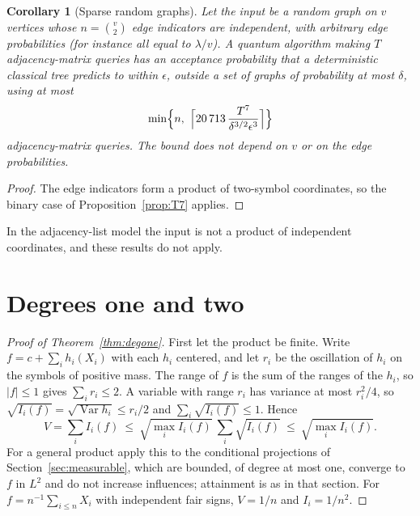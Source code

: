 \documentclass[11pt]{article}
\numberwithin{equation}{section}
\newcommand{\V}{\operatorname{Var}}
\theoremstyle{plain}
\newtheorem{corollary}[theorem]{Corollary}
\theoremstyle{remark}
\begin{document}
\begin{corollary}[Sparse random graphs]\label{cor:sparse}
Let the input be a random graph on $v$ vertices whose $n=\binom v2$ edge indicators are independent, with arbitrary edge probabilities (for instance all equal to $\lambda/v$). A quantum algorithm making $T$ adjacency-matrix queries has an acceptance probability that a deterministic classical tree predicts to within $\epsilon$, outside a set of graphs of probability at most $\delta$, using at most
\[
\min\Bigl\{n,\ \Bigl\lceil 20\,713\,\frac{T^7}{\delta^{3/2}\epsilon^{3}}\Bigr\rceil\Bigr\}
\]
adjacency-matrix queries. The bound does not depend on $v$ or on the edge probabilities.
\end{corollary}
\begin{proof}
The edge indicators form a product of two-symbol coordinates, so the binary case of Proposition~\ref{prop:T7} applies.
\end{proof}
In the adjacency-list model the input is not a product of independent coordinates, and these results do not apply.

\section{Degrees one and two}\label{sec:lowdeg}
\begin{proof}[Proof of Theorem~\ref{thm:degone}]
First let the product be finite. Write $f=c+\sum_ih_i(X_i)$ with each $h_i$ centered, and let $r_i$ be the oscillation of $h_i$ on the symbols of positive mass. The range of $f$ is the sum of the ranges of the $h_i$, so $|f|\le1$ gives $\sum_ir_i\le2$. A variable with range $r_i$ has variance at most $r_i^2/4$, so $\sqrt{I_i(f)}=\sqrt{\V h_i}\le r_i/2$ and $\sum_i\sqrt{I_i(f)}\le1$. Hence
\[
V=\sum_iI_i(f)\ \le\ \sqrt{\max_iI_i(f)}\ \sum_i\sqrt{I_i(f)}\ \le\ \sqrt{\max_iI_i(f)} .
\]
For a general product apply this to the conditional projections of Section~\ref{sec:measurable}, which are bounded, of degree at most one, converge to $f$ in $L^2$ and do not increase influences; attainment is as in that section. For $f=n^{-1}\sum_{i\le n}X_i$ with independent fair signs, $V=1/n$ and $I_i=1/n^2$.
\end{proof}
\end{document}
